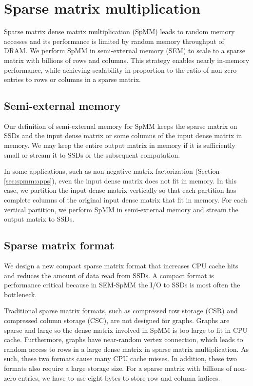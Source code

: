 \section{Sparse matrix multiplication} \label{sec:spmm}
Sparse matrix dense matrix multiplication (SpMM) leads to random memory
accesses and its performance is limited by random memory throughput
of DRAM. We perform SpMM in semi-external memory (SEM)
to scale to a sparse matrix with billions of rows and columns. This strategy enables
nearly in-memory performance, while achieving scalability in proportion
to the ratio of non-zero entries to rows or columns in a sparse matrix.

\subsection{Semi-external memory}
Our definition of semi-external memory for SpMM keeps the sparse matrix on
SSDs and the input dense matrix or some columns of the input dense matrix
in memory. We may keep the entire output matrix in memory if it is sufficiently
small or stream it to SSDs or the subsequent computation.

In some applications, such as non-negative matrix factorization (Section
\ref{sec:spmm:apps}), even the input dense matrix does not fit in memory. In this case,
we partition the input dense matrix vertically so that each partition has
complete columns of the original input dense matrix that fit in memory.
For each vertical partition, we perform SpMM in semi-external memory and
stream the output matrix to SSDs.

\subsection{Sparse matrix format}
We design a new compact sparse matrix format that increases CPU cache hits and 
reduces the amount of data read from SSDs. A compact format is performance critical 
because in SEM-SpMM the I/O to SSDs is most often the bottleneck.

Traditional sparse matrix formats, such as compressed row storage (CSR) and
compressed column storage (CSC), are not designed for graphs. Graphs are sparse
and large so the dense matrix involved in SpMM is too large to fit in CPU
cache. Furthermore, graphs have near-random vertex connection, which
leads to random access to rows in a large dense matrix in sparse matrix
multiplication. As such, these two formats cause
many CPU cache misses. In addition, these two formats also require a large
storage size. For a sparse matrix with billions of non-zero entries, we have to
use eight bytes to store row and column indices.

